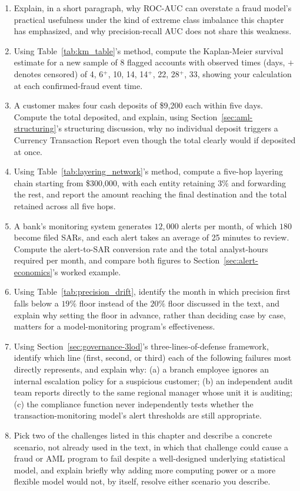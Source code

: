 \documentclass[../ai_in_finance]{subfiles}
\begin{document}
\begin{enumerate}
    \item Explain, in a short paragraph, why ROC-AUC can overstate a fraud model's practical usefulness under the kind of extreme class imbalance this chapter has emphasized, and why precision-recall AUC does not share this weakness.
    \item Using Table~\ref{tab:km_table}'s method, compute the Kaplan-Meier survival estimate for a new sample of 8 flagged accounts with observed times (days, $+$ denotes censored) of 4, 6$^+$, 10, 14, 14$^+$, 22, 28$^+$, 33, showing your calculation at each confirmed-fraud event time.
    \item A customer makes four cash deposits of \$9,200 each within five days. Compute the total deposited, and explain, using Section~\ref{sec:aml-structuring}'s structuring discussion, why no individual deposit triggers a Currency Transaction Report even though the total clearly would if deposited at once.
    \item Using Table~\ref{tab:layering_network}'s method, compute a five-hop layering chain starting from \$300,000, with each entity retaining $3\%$ and forwarding the rest, and report the amount reaching the final destination and the total retained across all five hops.
    \item A bank's monitoring system generates $12{,}000$ alerts per month, of which $180$ become filed SARs, and each alert takes an average of 25 minutes to review. Compute the alert-to-SAR conversion rate and the total analyst-hours required per month, and compare both figures to Section~\ref{sec:alert-economics}'s worked example.
    \item Using Table~\ref{tab:precision_drift}, identify the month in which precision first falls below a $19\%$ floor instead of the $20\%$ floor discussed in the text, and explain why setting the floor in advance, rather than deciding case by case, matters for a model-monitoring program's effectiveness.
    \item Using Section~\ref{sec:governance-3lod}'s three-lines-of-defense framework, identify which line (first, second, or third) each of the following failures most directly represents, and explain why: (a) a branch employee ignores an internal escalation policy for a suspicious customer; (b) an independent audit team reports directly to the same regional manager whose unit it is auditing; (c) the compliance function never independently tests whether the transaction-monitoring model's alert thresholds are still appropriate.
    \item Pick two of the challenges listed in this chapter and describe a concrete scenario, not already used in the text, in which that challenge could cause a fraud or AML program to fail despite a well-designed underlying statistical model, and explain briefly why adding more computing power or a more flexible model would not, by itself, resolve either scenario you describe.

\end{enumerate}
\end{document}
